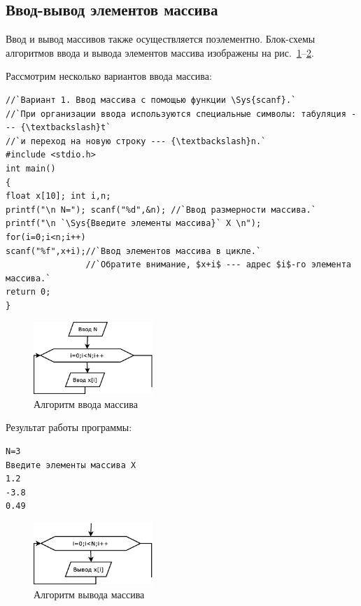 \subsection[Ввод-вывод элементов массива]{Ввод-вывод элементов массива}
Ввод и вывод массивов также осуществляется поэлементно. Блок-схемы алгоритмов ввода и вывода элементов массива
 изображены на рис.~\ref{ch05:refDrawing1}--\ref{ch05:refDrawing2}.

Рассмотрим несколько вариантов ввода массива:
\begin{lstlisting}
//`Вариант 1. Ввод массива с помощью функции \Sys{scanf}.`
//`При организации ввода используются специальные символы: табуляция --- {\textbackslash}t` 
//`и переход на новую строку --- {\textbackslash}n.`
#include <stdio.h>
int main()
{
float x[10]; int i,n; 
printf("\n N="); scanf("%d",&n); //`Ввод размерности массива.`
printf("\n `\Sys{Введите элементы массива}` X \n"); 
for(i=0;i<n;i++)
scanf("%f",x+i);//`Ввод элементов массива в цикле.` 
                //`Обратите внимание, $x+i$ --- адрес $i$-го элемента  массива.`
return 0;
}
\end{lstlisting}

\begin{figure}[htb]
\begin{center}
\includegraphics[width=0.4\textwidth]{img/ris_5_2}
\caption{Алгоритм ввода массива }
\label{ch05:refDrawing1}
\end{center}
\end{figure}

Результат работы программы:
\begin{verbatim}
N=3
Введите элементы массива X 
1.2
-3.8
0.49
\end{verbatim}
\begin{figure}[htb]
\begin{center}
\includegraphics[width=0.4\textwidth]{img/ris_5_3}
\caption{Алгоритм вывода массива }
\label{ch05:refDrawing2}
\end{center}
\end{figure}

